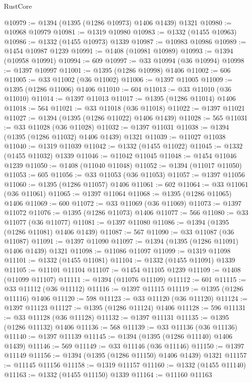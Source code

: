 \begin{lexlean}{RustCore}
\begin{coremodule}
@10979 := @1394 (@1395 (@1286 @10973) @1406 @1439) @1321
@10980 := @10968 @10979
@10981 := @1319 @10980
@10983 := @1332 (@1455 @10963)
@10986 := @1332 (@1455 @10973) @1339
@10987 := @10983 @10986
@10989 := @1454 @10987 @1239
@10991 := @1408 (@10981 @10989)
@10993 := @1394 (@10958 @10991)
@10994 := 609
@10997 := @33 @10994 (@36 @10994)
@10998 := @1397 @10997
@11001 := @1395 (@1286 @10998) @1406
@11002 := 606
@11005 := @33 @11002 (@36 @11002)
@11006 := @1397 @11005
@11009 := @1395 (@1286 @11006) @1406
@11010 := 604
@11013 := @33 @11010 (@36 @11010)
@11014 := @1397 @11013
@11017 := @1395 (@1286 @11014) @1406
@11018 := 564
@11021 := @33 @11018 (@36 @11018)
@11022 := @1397 @11021
@11027 := @1394 (@1395 (@1286 @11022) @1406 @1439)
@11028 := 565
@11031 := @33 @11028 (@36 @11028)
@11032 := @1397 @11031
@11038 := @1394 (@1395 (@1286 @11032) @1406 @1439) @1321
@11039 := @11027 @11038
@11040 := @1319 @11039
@11042 := @1332 (@1455 @11022)
@11045 := @1332 (@1455 @11032) @1339
@11046 := @11042 @11045
@11048 := @1454 @11046 @1239
@11050 := @1408 (@11040 @11048)
@11052 := @1394 (@11017 @11050)
@11053 := 605
@11056 := @33 @11053 (@36 @11053)
@11057 := @1397 @11056
@11060 := @1395 (@1286 @11057) @1406
@11061 := 602
@11064 := @33 @11061 (@36 @11061)
@11065 := @1397 @11064
@11068 := @1395 (@1286 @11065) @1406
@11069 := 600
@11072 := @33 @11069 (@36 @11069)
@11073 := @1397 @11072
@11076 := @1395 (@1286 @11073) @1406
@11077 := 566
@11080 := @33 @11077 (@36 @11077)
@11081 := @1397 @11080
@11086 := @1394 (@1395 (@1286 @11081) @1406 @1439)
@11087 := 567
@11090 := @33 @11087 (@36 @11087)
@11091 := @1397 @11090
@11097 := @1394 (@1395 (@1286 @11091) @1406 @1439) @1321
@11098 := @11086 @11097
@11099 := @1319 @11098
@11101 := @1332 (@1455 @11081)
@11104 := @1332 (@1455 @11091) @1339
@11105 := @11101 @11104
@11107 := @1454 @11105 @1239
@11109 := @1408 (@11099 @11107)
@11111 := @1394 (@11076 @11109)
@11112 := 601
@11115 := @33 @11112 (@36 @11112)
@11116 := @1397 @11115
@11119 := @1395 (@1286 @11116) @1406
@11120 := 598
@11123 := @33 @11120 (@36 @11120)
@11124 := @1397 @11123
@11127 := @1395 (@1286 @11124) @1406
@11128 := 596
@11131 := @33 @11128 (@36 @11128)
@11132 := @1397 @11131
@11135 := @1395 (@1286 @11132) @1406
@11136 := 568
@11139 := @33 @11136 (@36 @11136)
@11140 := @1397 @11139
@11145 := @1394 (@1395 (@1286 @11140) @1406 @1439)
@11146 := 569
@11149 := @33 @11146 (@36 @11146)
@11150 := @1397 @11149
@11156 := @1394 (@1395 (@1286 @11150) @1406 @1439) @1321
@11157 := @11145 @11156
@11158 := @1319 @11157
@11160 := @1332 (@1455 @11140)
@11163 := @1332 (@1455 @11150) @1339
@11164 := @11160 @11163

\end{coremodule}
\end{lexlean}
